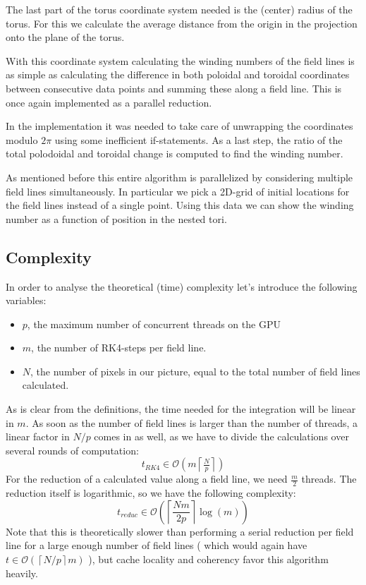 \documentclass[a4paper]{article}
\renewcommand{\O}[1]{\ensuremath{\mathcal{O}\left(#1\right)}}
\begin{document}
The last part of the torus coordinate system needed is the (center) radius of the torus. For this we calculate the average distance from the origin in the projection onto the plane of the torus. %

With this coordinate system calculating the winding numbers of the field lines is as simple as calculating the difference in both poloidal and toroidal coordinates between consecutive data points and summing these along a field line. This is once again implemented as a parallel reduction.

In the implementation it was needed to take care of unwrapping the coordinates modulo $2\pi$ using some inefficient if-statements. %
As a last step, the ratio of the total polodoidal and toroidal change is computed to find the winding number.

As mentioned before this entire algorithm is parallelized by considering multiple field lines simultaneously. In particular we pick a 2D-grid of initial locations for the field lines instead of a single point. Using this data we can show the winding number as a function of position in the nested tori.\\
\subsection{Complexity}
In order to analyse the theoretical (time) complexity let's introduce the following variables:
\begin{itemize}
	\item $p$, the maximum number of concurrent threads on the GPU
	\item $m$, the number of RK4-steps per field line.
	\item $N$, the number of pixels in our picture, equal to the total number of field lines calculated.
\end{itemize}
As is clear from the definitions, the time needed for the integration will be linear in $m$. As soon as the number of field lines is larger than the number of threads, a linear factor in $N/p$ comes in as well, as we have to divide the calculations over several rounds of computation:
\[t_{RK4}\in\O{m\left\lceil\tfrac{N}{p}\right\rceil}\]
For the reduction of a calculated value along a field line, we need $\frac m2$ threads. The reduction itself is logarithmic, so we have the following complexity:
\[t_\textit{reduc} \in \O{\left\lceil\frac{Nm}{2p}\right\rceil\log\left(m\right)} \]
Note that this is theoretically slower than performing a serial reduction per field line for a large enough number of field lines ( which would again have $t \in \O{\left\lceil N/p\right\rceil m}$ ), but cache locality and coherency favor this algorithm heavily.
\end{document}
